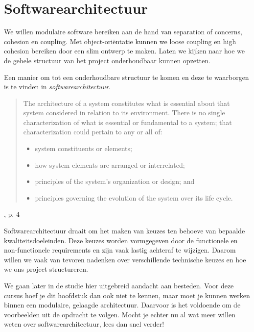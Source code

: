 \chapter{Softwarearchitectuur}
We willen modulaire software bereiken aan de hand van 
separation of concerns, cohesion en coupling.
Met object-oriëntatie kunnen we loose coupling en high cohesion bereiken
door een slim ontwerp te maken. 
Laten we kijken naar hoe we de gehele structuur van het project
onderhoudbaar kunnen opzetten.

Een manier om tot een onderhoudbare structuur 
te komen en deze te waarborgen is te vinden 
in \emph{softwarearchitectuur}. 
\blockquote{
    The architecture of a system constitutes what is essential 
    about that system considered in relation to its environment.
    There is no single characterization of what is essential 
    or fundamental to a system; that characterization could pertain to any or all of:
    \begin{itemize}
        \item system constituents or elements;
        \item how system elements are arranged or interrelated; 
        \item principles of the system’s organization or design; and 
        \item principles governing the evolution of the system over its life cycle.
    \end{itemize}
}{\cite{ISO42010}, p. 4}

Softwarearchitectuur draait om het maken van keuzes ten behoeve
van bepaalde kwaliteitsdoeleinden. Deze keuzes worden vormgegeven
door de functionele en non-functionele requirements en zijn vaak lastig
achteraf te wijzigen. Daarom willen we vaak van tevoren nadenken over 
verschillende technische keuzes en hoe we ons project structureren. 

We gaan later in de studie hier uitgebreid aandacht aan besteden.
Voor deze cursus hoef je dit hoofdstuk dan ook niet te kennen, maar moet je
kunnen werken binnen een modulaire, gelaagde architectuur. 
Daarvoor is het voldoende om de voorbeelden uit de opdracht te volgen. 
Mocht je echter nu al wat meer willen weten over softwarearchitectuur, 
lees dan snel verder!

